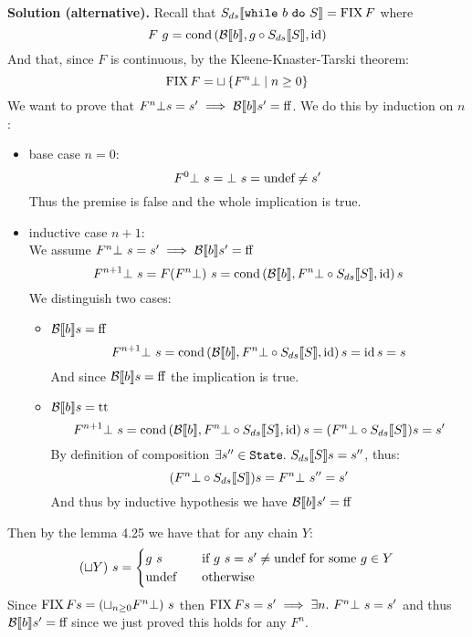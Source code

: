 \par\medskip\noindent \textbf{Solution (alternative).} \rmfamily
Recall that $S_{ds} \llbracket \texttt{while}\ b\ \texttt{do}\ S \rrbracket = \operatorname{FIX} F$ where
\[ F\ g= \operatorname{cond}\left(\mathcal{B} \llbracket b \rrbracket, g \circ S_{ds} \llbracket S \rrbracket, \operatorname{id}\right) \]
And that, since $F$ is continuous, by the Kleene-Knaster-Tarski theorem:
\[ \operatorname{FIX}{F} = \sqcup \left\{ F^n \bot \mid n \geq 0 \right\} \]
We want to prove that $F^n \bot s = s' \implies \mathcal{B} \llbracket b \rrbracket s' = \text{ff}$. We do this by induction on $n$:
\begin{itemize}
    \item base case $n = 0$:
        \[ F^0 \bot\ s = \bot\ s = \text{undef} \neq s' \]
        Thus the premise is false and the whole implication is true.
    \item inductive case $n + 1$: \\
        We assume $F^n \bot\ s = s' \implies \mathcal{B} \llbracket b \rrbracket s' = \text{ff}$
        \[ F^{n+1} \bot\ s = F(F^n \bot)\ s = \operatorname{cond}\left(\mathcal{B} \llbracket b \rrbracket, F^n \bot \circ S_{ds} \llbracket S \rrbracket, \operatorname{id}\right) s \]
        We distinguish two cases:
        \begin{itemize}
            \item $\mathcal{B} \llbracket b \rrbracket s = \text{ff}$
                \[ F^{n+1} \bot\ s = \operatorname{cond}\left(\mathcal{B} \llbracket b \rrbracket, F^n \bot \circ S_{ds} \llbracket S \rrbracket, \operatorname{id}\right) s = \operatorname{id} s = s \]
                And since $\mathcal{B} \llbracket b \rrbracket s = \text{ff}$ the implication is true.
            \item $\mathcal{B} \llbracket b \rrbracket s = \text{tt}$
                \[ F^{n+1} \bot\ s = \operatorname{cond}\left(\mathcal{B} \llbracket b \rrbracket, F^n \bot \circ S_{ds} \llbracket S \rrbracket, \operatorname{id}\right) s = (F^n \bot \circ S_{ds} \llbracket S \rrbracket) s = s' \]
                By definition of composition $\exists s'' \in \State.\ \Sds{S} s = s''$, thus:
                \[ (F^n \bot \circ S_{ds} \llbracket S \rrbracket) s = F^n \bot\ s'' = s' \]
                And thus by inductive hypothesis we have $\mathcal{B} \llbracket b \rrbracket s' = \text{ff}$
        \end{itemize}
\end{itemize}
Then by the lemma 4.25 we have that for any chain $Y$:
\[ (\sqcup Y)\ s = \begin{cases}
    g\ s &\quad \text{if } g\ s = s' \neq \text{undef} \text{ for some } g \in Y \\
    \text{undef} &\quad \text{otherwise}
\end{cases} \]
Since $\operatorname{FIX}{F} s = (\sqcup_{n \geq 0} F^n \bot)\ s$ then $\operatorname{FIX}{F} s = s' \implies \exists n.\ F^n \bot\ s = s'$ and thus $\mathcal{B} \llbracket b \rrbracket s' = \text{ff}$ since we just proved this holds for any $F^n$.
